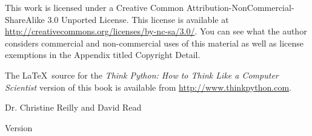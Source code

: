 \begin{latexonly}
{This work is licensed under a 
Creative Common
Attribution-NonCommercial-ShareAlike 3.0 Unported License.
This license is 
available at
\url{http://creativecommons.org/licenses/by-nc-sa/3.0/}.  You can 
see what the author considers commercial and non-commercial
uses of this material as well as license exemptions 
in the Appendix titled Copyright Detail.

The \LaTeX\ source for the 
\emph{Think Python: How to Think Like
a Computer Scientist}
version of this book is available from
\url{http://www.thinkpython.com}.

\vspace{0.2in}

} %

\end{latexonly}





{\Large \thetitle}

{\large Dr. Christine Reilly and David Read}

Version \theversion

\setcounter{chapter}{0}

